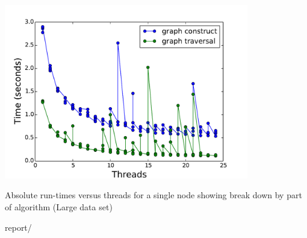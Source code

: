 \documentclass{article}
\begin{document}
\begin{minipage}{\linewidth}
  \captionsetup{type=figure}
  \begin{center}
  \includegraphics[width=0.8\textwidth]{single_split_time.pdf}
  \end{center}
  \caption{Absolute run-times versus threads for a single node showing break down by part of algorithm (Large data set)} \label{fig:split}
\end{minipage}


report/










\end{document}
